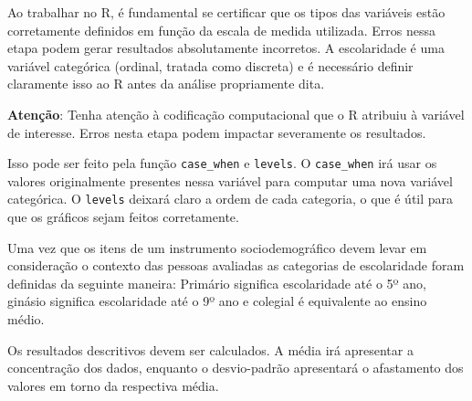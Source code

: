 \documentclass[
]{book}
\newenvironment{Shaded}{\begin{snugshade}}{\end{snugshade}}
\newcommand{\DataTypeTok}[1]{\textcolor[rgb]{0.13,0.29,0.53}{#1}}
\newcommand{\DecValTok}[1]{\textcolor[rgb]{0.00,0.00,0.81}{#1}}
\newcommand{\KeywordTok}[1]{\textcolor[rgb]{0.13,0.29,0.53}{\textbf{#1}}}
\newcommand{\NormalTok}[1]{#1}
\newcommand{\OperatorTok}[1]{\textcolor[rgb]{0.81,0.36,0.00}{\textbf{#1}}}
\newcommand{\StringTok}[1]{\textcolor[rgb]{0.31,0.60,0.02}{#1}}
\begin{document}
Ao trabalhar no R, é fundamental se certificar que os tipos das variáveis estão corretamente definidos em função da escala de medida utilizada. Erros nessa etapa podem gerar resultados absolutamente incorretos. A escolaridade é uma variável categórica (ordinal, tratada como discreta) e é necessário definir claramente isso ao R antes da análise propriamente dita.

\textbf{Atenção}: Tenha atenção à codificação computacional que o R atribuiu à variável de interesse. Erros nesta etapa podem impactar severamente os resultados.

Isso pode ser feito pela função \texttt{case\_when} e \texttt{levels}. O \texttt{case\_when} irá usar os valores originalmente presentes nessa variável para computar uma nova variável categórica. O \texttt{levels} deixará claro a ordem de cada categoria, o que é útil para que os gráficos sejam feitos corretamente.

Uma vez que os itens de um instrumento sociodemográfico devem levar em consideração o contexto das pessoas avaliadas as categorias de escolaridade foram definidas da seguinte maneira: Primário significa escolaridade até o 5º ano, ginásio significa escolaridade até o 9º ano e colegial é equivalente ao ensino médio.

\begin{Shaded}
\end{Shaded}

Os resultados descritivos devem ser calculados. A média irá apresentar a concentração dos dados, enquanto o desvio-padrão apresentará o afastamento dos valores em torno da respectiva média.
\end{document}
